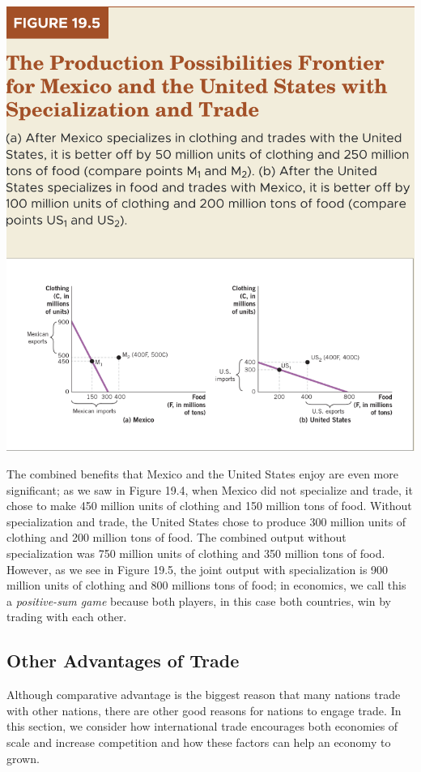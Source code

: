 \documentclass[11pt]{article} %
\begin{document}
\begin{center}
\includegraphics[scale=0.5]{images/Figure 19.5.png} 
\end{center}

The combined benefits that Mexico and the United States enjoy are even more significant; as we saw in Figure 19.4, when Mexico did not specialize and trade, it chose to make 450 million units of clothing and 150 million tons of food. Without specialization and trade, the United States chose to produce 300 million units of clothing and 200 million tons of food. The combined output without specialization was 750 million units of clothing and 350 million tons of food. However, as we see in Figure 19.5, the joint output with specialization is 900 million units of clothing and 800 millions tons of food; in economics, we call this a \textit{positive-sum game} because both players, in this case both countries, win by trading with each other.

\subsection*{Other Advantages of Trade}
Although comparative advantage is the biggest reason that many nations trade with other nations, there are other good reasons for nations to engage trade. In this section, we consider how international trade encourages both economies of scale and increase competition and how these factors can help an economy to grown.
\end{document}
